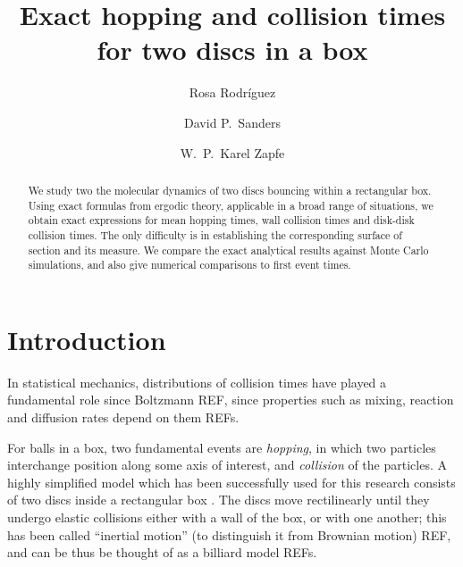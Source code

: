 \documentclass[superscriptaddress,pre,reprint,showpacs,onecolumn]{revtex4-1}
\begin{document}
\title{Exact hopping and collision times for two discs in a box}

\author{Rosa Rodríguez}

\author{David P.~Sanders}

\author{W.~P.~Karel Zapfe}


\begin{abstract}
We study two the molecular dynamics of two discs bouncing within a rectangular box.
Using exact formulas from ergodic theory, applicable in a broad range of situations, we obtain exact expressions for mean hopping times, wall collision times and disk-disk collision times.
The only difficulty is in establishing the corresponding surface
of section and its measure.  
We compare the exact analytical results against Monte Carlo simulations, 
and also give numerical comparisons to first event times.
\end{abstract}

\maketitle



\section{Introduction}


In statistical mechanics, distributions of collision times have played a fundamental role 
since Boltzmann REF, since properties
such as mixing, reaction and diffusion rates depend on them REFs.

For balls in a box, two fundamental events are \emph{hopping},
in which two particles interchange position along some
axis of interest, and \emph{collision} of the particles. 
A highly simplified model which has been successfully  used for
this research consists of two discs inside a rectangular
box \cite{Awazu01, Munakata02, Suh05}. The discs move rectilinearly until they undergo
elastic collisions either with a wall of the box, or with one another; this has been called ``inertial motion'' (to distinguish it from Brownian motion) REF, and can be thus be thought of as a billiard model REFs.
\end{document}
